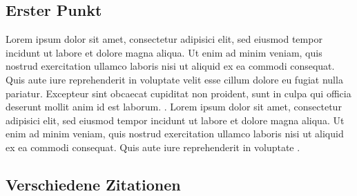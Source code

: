 \subsection{Erster Punkt}
Lorem ipsum dolor sit amet, consectetur adipisici elit, sed eiusmod tempor incidunt ut labore et dolore magna aliqua. Ut enim ad minim veniam, quis nostrud exercitation ullamco laboris nisi ut aliquid ex ea commodi consequat. Quis aute iure reprehenderit in voluptate velit esse cillum dolore eu fugiat nulla pariatur. Excepteur sint obcaecat cupiditat non proident, sunt in culpa qui officia deserunt mollit anim id est laborum. \cite{zeichner_teaching_2000}. Lorem ipsum dolor sit amet, consectetur adipisici elit, sed eiusmod tempor incidunt ut labore et dolore magna aliqua. Ut enim ad minim veniam, quis nostrud exercitation ullamco laboris nisi ut aliquid ex ea commodi consequat. Quis aute iure reprehenderit in voluptate \cite{kitsantas_college_2007}.

\subsection{Verschiedene Zitationen}
\cite{abrami_using_2013}

\cite[p. 2]{heinrich_preparation_2007}

\citeauthor{pintrich_motivational_1990}

\citeyear[p. 2]{alshammari_meta-analysis_2013}

\citeauthor{ziegler_hochbegabung_2008} \citeyear{ziegler_hochbegabung_2008}

